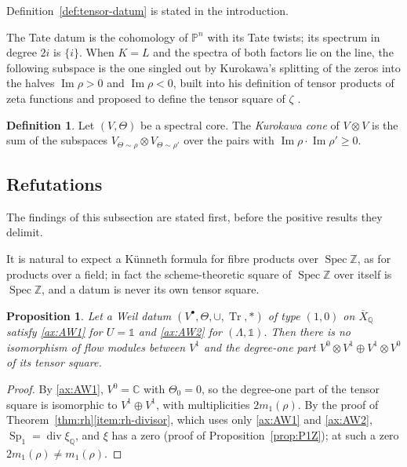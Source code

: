 \documentclass[11pt]{amsart}
\theoremstyle{plain}
\newtheorem{proposition}[theorem]{Proposition}
\theoremstyle{definition}
\newtheorem{definition}[theorem]{Definition}
\theoremstyle{remark}
\numberwithin{equation}{section}
\newcommand{\C}{\mathbb{C}}
\newcommand{\Q}{\mathbb{Q}}
\newcommand{\Z}{\mathbb{Z}}
\newcommand{\Xbar}{\overline{X}}
\DeclareMathOperator{\Tr}{Tr}
\DeclareMathOperator{\Spec}{Spec}
\DeclareMathOperator{\divisor}{div}
\DeclareMathOperator{\Ima}{Im}
\renewcommand{\Im}{\Ima}
\begin{document}
Definition~\ref{def:tensor-datum} is stated in the introduction.


The Tate datum is the cohomology of $\mathbb{P}^n$ with its Tate
twists; its spectrum in degree $2i$ is $\{i\}$. When $K=L$ and the
spectra of both factors lie on the line, the following subspace is the
one singled out by Kurokawa's splitting of the zeros into the halves
$\Im\rho>0$ and $\Im\rho<0$, built into his definition of tensor
products of zeta functions \cite[p.~219]{Kurokawa1992MultipleZeta} and
proposed to define the tensor square of $\zeta$
\cite[\S5.2, p.~158]{Manin1995Lectures}.

\begin{definition}\label{def:kurokawa-cone}
Let $(V,\Theta)$ be a spectral core. The \emph{Kurokawa cone} of
$V\otimes V$ is the sum of the subspaces
$V_{\Theta\sim\rho}\otimes V_{\Theta\sim\rho'}$ over the pairs with
$\Im\rho\cdot\Im\rho'\ge0$.
\end{definition}

\subsection{Refutations}\label{subsec:kun-neg}

The findings of this subsection are stated first, before the positive
results they delimit.

It is natural to expect a K\"unneth formula for fibre products over
$\Spec\Z$, as for products over a field; in fact the scheme-theoretic
square of $\Spec\Z$ over itself is $\Spec\Z$, and a datum is never its
own tensor square.

\begin{proposition}\label{prop:kun-over-Z}
Let a Weil datum $(V^\bullet,\Theta,\cup,\Tr,*)$ of type $(1,0)$ on
$\Xbar_\Q$ satisfy \ref{ax:AW1} for $U=\mathbb 1$ and \ref{ax:AW2} for
$(\Lambda,\mathbb 1)$. Then there is no isomorphism of flow modules
between $V^1$ and the degree-one part $V^0\otimes V^1\oplus V^1\otimes
V^0$ of its tensor square.
\end{proposition}

\begin{proof}
By \ref{ax:AW1}, $V^0=\C$ with $\Theta_0=0$, so the degree-one part of
the tensor square is isomorphic to $V^1\oplus V^1$, with multiplicities
$2m_1(\rho)$. By the proof of Theorem~\ref{thm:rh}\ref{item:rh-divisor},
which uses only \ref{ax:AW1} and \ref{ax:AW2},
$\operatorname{Sp}_1=\divisor\xi_\Q$, and $\xi$ has a zero (proof of
Proposition~\ref{prop:P1Z}); at such a zero $2m_1(\rho)\ne m_1(\rho)$.
\end{proof}
\end{document}
